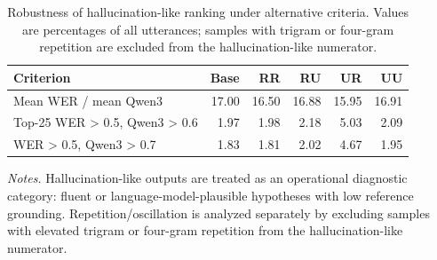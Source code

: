 \begin{table}[t]
\centering
\caption{Robustness of hallucination-like ranking under alternative criteria. Values are percentages of all utterances; samples with trigram or four-gram repetition are excluded from the hallucination-like numerator.}
\label{tab:hallucination_robustness}
\small
\setlength{\tabcolsep}{5pt}
\begin{tabular}{lrrrrr}
\toprule
\textbf{Criterion} & \textbf{Base} & \textbf{RR} & \textbf{RU} & \textbf{UR} & \textbf{UU} \\
\midrule
Mean WER / mean Qwen3 & 17.00 & 16.50 & 16.88 & 15.95 & 16.91 \\
Top-25%
WER > 0.5, Qwen3 > 0.6 & 1.97 & 1.98 & 2.18 & 5.03 & 2.09 \\
WER > 0.5, Qwen3 > 0.7 & 1.83 & 1.81 & 2.02 & 4.67 & 1.95 \\
\bottomrule
\end{tabular}
\vspace{0.5em}
\begin{minipage}{0.95\linewidth}
\footnotesize
\textit{Notes.} Hallucination-like outputs are treated as an operational diagnostic category: fluent or language-model-plausible hypotheses with low reference grounding. Repetition/oscillation is analyzed separately by excluding samples with elevated trigram or four-gram repetition from the hallucination-like numerator.
\end{minipage}
\end{table}
